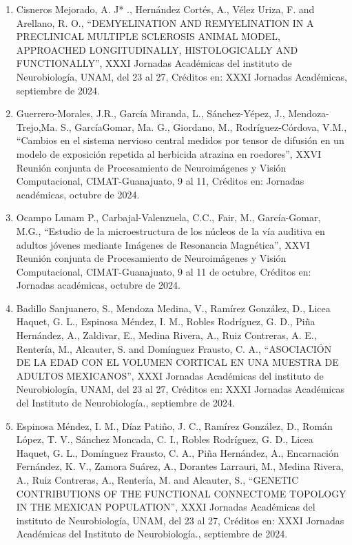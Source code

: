\documentclass[12pt]{article}
\begin{document}
\begin{enumerate}
\item Cisneros Mejorado, A. J* ., Hernández Cortés, A., Vélez Uriza, F. and Arellano, R. O., “DEMYELINATION AND REMYELINATION IN A 
PRECLINICAL MULTIPLE SCLEROSIS ANIMAL MODEL, APPROACHED LONGITUDINALLY, HISTOLOGICALLY AND FUNCTIONALLY”, XXXI Jornadas Académicas del 
instituto de Neurobiología, UNAM, del 23 al 27, Créditos en: XXXI Jornadas Académicas, septiembre de 2024.

\item Guerrero-Morales, J.R., García Miranda, L., Sánchez-Yépez, J., Mendoza-Trejo,Ma. S., GarcíaGomar, Ma. G., Giordano, M., 
Rodríguez-Córdova, V.M., “Cambios en el sistema nervioso central medidos por tensor de difusión en un modelo de exposición repetida al 
herbicida atrazina en roedores”, XXVI Reunión conjunta de Procesamiento de Neuroimágenes y Visión Computacional, CIMAT-Guanajuato, 9 al 
11, Créditos en: Jornadas académicas, octubre de 2024.

\item Ocampo Lunam P., Carbajal-Valenzuela, C.C., Fair, M., García-Gomar, M.G., “Estudio de la microestructura de los núcleos de la vía 
auditiva en adultos jóvenes mediante Imágenes de Resonancia Magnética”, XXVI Reunión conjunta de Procesamiento de Neuroimágenes y 
Visión Computacional, CIMAT-Guanajuato, 9 al 11 de octubre, Créditos en: Jornadas académicas, octubre de 2024.

\item Badillo Sanjuanero, S., Mendoza Medina, V., Ramírez González, D., Licea Haquet, G. L., Espinosa Méndez, I. M., Robles Rodríguez, 
G. 
D., Piña Hernández, A., Zaldivar, E., Medina Rivera, A., Ruiz Contreras, A. E., Rentería, M., Alcauter, S. and Domínguez Frausto, C. 
A., “ASOCIACIÓN DE LA EDAD CON EL VOLUMEN CORTICAL EN UNA MUESTRA DE ADULTOS MEXICANOS”, XXXI Jornadas Académicas del instituto de 
Neurobiología, UNAM, del 23 al 27, Créditos en: XXXI Jornadas Académicas del Instituto de Neurobiología., septiembre de 2024.

\item Espinosa Méndez, I. M., Díaz Patiño, J. C., Ramírez González, D., Román López, T. V., Sánchez Moncada, C. I., Robles Rodríguez, 
G. 
D., Licea Haquet, G. L., Domínguez Frausto, C. A., Piña Hernández, A., Encarnación Fernández, K. V., Zamora Suárez, A., Dorantes 
Larrauri, M., Medina Rivera, A., Ruiz Contreras, A., Rentería, M. and Alcauter, S., “GENETIC CONTRIBUTIONS OF THE FUNCTIONAL CONNECTOME 
TOPOLOGY IN THE MEXICAN POPULATION”, XXXI Jornadas Académicas del instituto de Neurobiología, UNAM, del 23 al 27, Créditos en: XXXI 
Jornadas Académicas del Instituto de Neurobiología., septiembre de 2024.


\end{enumerate}
\end{document}
